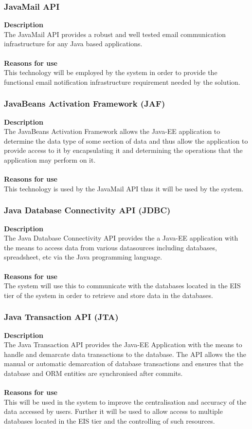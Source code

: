 \documentclass[12pt]{article}
\begin{document}
\subsubsection{JavaMail API}
\textbf{Description}\\
The JavaMail API provides a robust and well tested email communication infrastructure for any Java based applications.\\\\
\textbf{Reasons for use}\\
This technology will be employed by the system in order to provide the functional email notification infrastructure requirement needed by the solution.

\subsubsection{JavaBeans Activation Framework (JAF)}
\textbf{Description}\\
The JavaBeans Activation Framework allows the Java-EE application to determine the data type of some section of data and thus allow the application to provide access to it by encapsulating it and determining the operations that the application may perform on it.\\\\
\textbf{Reasons for use}\\
This technology is used by the JavaMail API thus it will be used by the system. 

\subsubsection{Java Database Connectivity API (JDBC)}
\textbf{Description}\\
The Java Database Connectivity API provides the a Java-EE application with the means to access data from various datasources including databases, spreadsheet, etc via the Java programming language.\\\\
\textbf{Reasons for use}\\
The system will use this to communicate with the databases located in the EIS tier of the system in order to retrieve and store data in the databases. 

\subsubsection{Java Transaction API (JTA)}
\textbf{Description}\\
The Java Transaction API provides the Java-EE Application with the means to handle and demarcate data transactions to the database. The API allows the the manual or automatic demarcation of database transactions and ensures that the database and ORM entities are synchronised after commits.\\\\ 
\textbf{Reasons for use}\\
This will be used in the system to improve the centralisation and accuracy of the data accessed by users. Further it will be used to allow access to multiple databases located in the EIS tier and the controlling of such resources.
\end{document}
